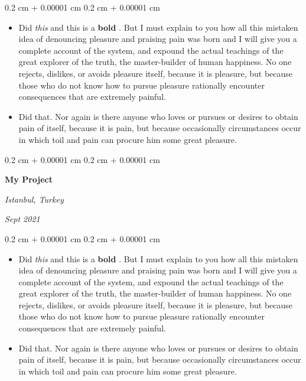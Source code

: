 \documentclass[10pt, letterpaper]{article}
\newenvironment{highlights}{
    \begin{itemize}[
        topsep=0.10 cm,
        parsep=0.10 cm,
        partopsep=0pt,
        itemsep=0pt,
        leftmargin=0.4 cm + 10pt
    ]
}{
    \end{itemize}
} %
\newenvironment{onecolentry}{
    \begin{adjustwidth}{
        0.2 cm + 0.00001 cm
    }{
        0.2 cm + 0.00001 cm
    }
}{
    \end{adjustwidth}
} %
\newenvironment{twocolentry}[2][]{
    \onecolentry
    \def\secondColumn{#2}
    \setcolumnwidth{\fill, 4.5 cm}
    \begin{paracol}{2}
}{
    \switchcolumn \raggedleft \secondColumn
    \end{paracol}
    \endonecolentry
} %
\let\hrefWithoutArrow\href
\renewcommand{\href}[2]{\hrefWithoutArrow{#1}{\ifthenelse{\equal{#2}{}}{ }{#2 }\raisebox{.15ex}{\footnotesize \faExternalLink*}}}
\begin{document}
        \vspace{0.10 cm}
        \begin{onecolentry}
            \begin{highlights}
                \item Did \textit{this} and this is a \textbf{bold} \href{https://example.com}{link}. But I must explain to you how all this mistaken idea of denouncing pleasure and praising pain was born and I will give you a complete account of the system, and expound the actual teachings of the great explorer of the truth, the master-builder of human happiness. No one rejects, dislikes, or avoids pleasure itself, because it is pleasure, but because those who do not know how to pursue pleasure rationally encounter consequences that are extremely painful.
                \item Did that. Nor again is there anyone who loves or pursues or desires to obtain pain of itself, because it is pain, but because occasionally circumstances occur in which toil and pain can procure him some great pleasure.
            \end{highlights}
        \end{onecolentry}


        \vspace{0.2 cm}

        \begin{twocolentry}{
        \textit{Istanbul, Turkey}    
            
        \textit{Sept 2021}}
            \textbf{My Project}
        \end{twocolentry}

        \vspace{0.10 cm}
        \begin{onecolentry}
            \begin{highlights}
                \item Did \textit{this} and this is a \textbf{bold} \href{https://example.com}{link}. But I must explain to you how all this mistaken idea of denouncing pleasure and praising pain was born and I will give you a complete account of the system, and expound the actual teachings of the great explorer of the truth, the master-builder of human happiness. No one rejects, dislikes, or avoids pleasure itself, because it is pleasure, but because those who do not know how to pursue pleasure rationally encounter consequences that are extremely painful.
                \item Did that. Nor again is there anyone who loves or pursues or desires to obtain pain of itself, because it is pain, but because occasionally circumstances occur in which toil and pain can procure him some great pleasure.
            \end{highlights}
        \end{onecolentry}
\end{document}
